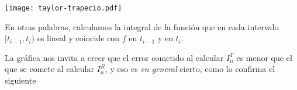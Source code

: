 \centerline{\texttt{[image: taylor-trapecio.pdf]}}

En otras palabras, calculamos la integral de la función que en cada intervalo $[t_{i-1},t_i)$ es lineal y coincide con $f$ en $t_{i-1}$ y en $t_i$.

La gráfica nos invita a creer que el error cometido al calcular $I_n^T$ es menor que el que se comete al calcular $I_n^R$, y eso es \emph{en general} cierto, como lo confirma el siguiente 


